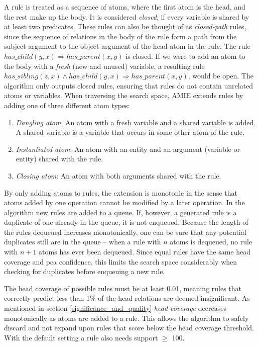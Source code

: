 A rule is treated as a sequence of atoms, where the first atom is the head, and the rest make up the body. It is considered \textit{closed}, if every variable is shared by at least two predicates. These rules can also be thought of as \textit{closed-path} rules, since the sequence of relations in the body of the rule form a path from the subject argument to the object argument of the head atom in the rule. The rule $has\_child(y, x) \Rightarrow has\_parent(x, y)$ is closed. If we were to add an atom to the body with a \textit{fresh} (new and unused) variable, a resulting rule $has\_sibling(z, x) \wedge has\_child(y, x) \Rightarrow has\_parent(x, y)$, would be open. The algorithm only outputs closed rules, ensuring that rules do not contain unrelated atoms or variables. When traversing the search space, AMIE extends rules by adding one of three different atom types:
\begin{enumerate}
    \item \textit{Dangling atom}: An atom with a fresh variable and a shared variable is added. A shared variable is a variable that occurs in some other atom of the rule.
    \item \textit{Instantiated atom}: An atom with an entity and an argument (variable or entity) shared with the rule.
    \item \textit{Closing atom}: An atom with both arguments shared with the rule.
\end{enumerate}

By only adding atoms to rules, the extension is monotonic in the sense that atoms added by one operation cannot be modified by a later operation. In the algorithm new rules are added to a queue. If, however, a generated rule is a duplicate of one already in the queue, it is not enqueued. Because the length of the rules dequeued increases monotonically, one can be sure that any potential duplicates still are in the queue -- when a rule with $n$ atoms is dequeued, no rule with $n+1$ atoms has ever been dequeued. Since equal rules have the same head coverage and \gls{pca} confidence, this limits the search space considerably when checking for duplicates before enqueuing a new rule.

The head coverage of possible rules must be at least 0.01, meaning rules that correctly predict less than 1\% of the head relations are deemed insignificant. As mentioned in section \ref{significance_and_quality} \textit{head coverage} decreases monotonically as atoms are added to a rule. This allows the algorithm to safely discard and not expand upon rules that score below the head coverage threshold. With the default setting a rule also needs support $\geq$ 100. %

